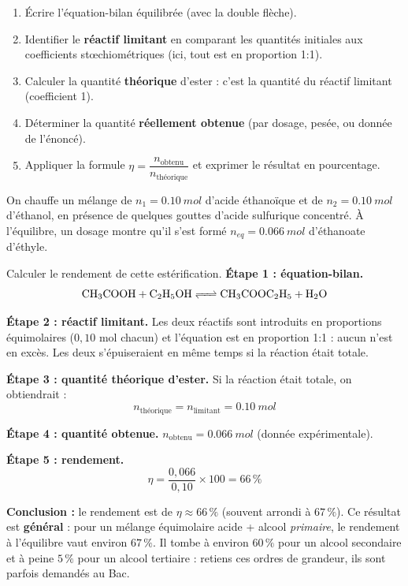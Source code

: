 \documentclass[11pt]{article}
\begin{document}
\begin{methode}
\begin{enumerate}
\item Écrire l'équation-bilan équilibrée (avec la double flèche).
\item Identifier le \textbf{réactif limitant} en comparant les quantités initiales aux coefficients stœchiométriques (ici, tout est en proportion 1:1).
\item Calculer la quantité \textbf{théorique} d'ester : c'est la quantité du réactif limitant (coefficient 1).
\item Déterminer la quantité \textbf{réellement obtenue} (par dosage, pesée, ou donnée de l'énoncé).
\item Appliquer la formule $\eta = \dfrac{n_{\text{obtenu}}}{n_{\text{théorique}}}$ et exprimer le résultat en pourcentage.
\end{enumerate}
\end{methode}

\begin{exoresolu}
On chauffe un mélange de $n_1 = \SI{0,10}{mol}$ d'acide éthanoïque et de $n_2 = \SI{0,10}{mol}$ d'éthanol, en présence de quelques gouttes d'acide sulfurique concentré. À l'équilibre, un dosage montre qu'il s'est formé $n_{eq} = \SI{0,066}{mol}$ d'éthanoate d'éthyle.

Calculer le rendement de cette estérification.
\tcblower
\textbf{Étape 1 : équation-bilan.}
\[ \ce{CH3COOH + C2H5OH <=> CH3COOC2H5 + H2O} \]

\textbf{Étape 2 : réactif limitant.} Les deux réactifs sont introduits en proportions équimolaires ($0,10$ mol chacun) et l'équation est en proportion 1:1 : aucun n'est en excès. Les deux s'épuiseraient en même temps si la réaction était totale.

\textbf{Étape 3 : quantité théorique d'ester.} Si la réaction était totale, on obtiendrait :
\[ n_{\text{théorique}} = n_{\text{limitant}} = \SI{0,10}{mol} \]

\textbf{Étape 4 : quantité obtenue.} $n_{\text{obtenu}} = \SI{0,066}{mol}$ (donnée expérimentale).

\textbf{Étape 5 : rendement.}
\[ \eta = \frac{0,066}{0,10} \times 100 = 66\,\% \]

\textbf{Conclusion :} le rendement est de $\eta \approx 66\,\%$ (souvent arrondi à $67\,\%$). Ce résultat est \textbf{général} : pour un mélange équimolaire acide + alcool \emph{primaire}, le rendement à l'équilibre vaut environ $67\,\%$. Il tombe à environ $60\,\%$ pour un alcool secondaire et à peine $5\,\%$ pour un alcool tertiaire : retiens ces ordres de grandeur, ils sont parfois demandés au Bac.
\end{exoresolu}
\end{document}
